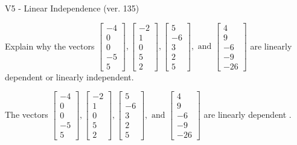\begin{exercise}
  \begin{exerciseTitle}V5 - Linear Independence (ver. 135)\end{exerciseTitle}
  \begin{exerciseStatement}
    Explain why the vectors \(\left[\begin{array}{r}
-4 \\
0 \\
0 \\
-5 \\
5
\end{array}\right] , \left[\begin{array}{r}
-2 \\
1 \\
0 \\
5 \\
2
\end{array}\right] , \left[\begin{array}{r}
5 \\
-6 \\
3 \\
2 \\
5
\end{array}\right] , \text{ and } \left[\begin{array}{r}
4 \\
9 \\
-6 \\
-9 \\
-26
\end{array}\right]\) are linearly dependent or linearly independent.	


  \end{exerciseStatement}
  \begin{exerciseAnswer}
   The vectors \(\left[\begin{array}{r}
-4 \\
0 \\
0 \\
-5 \\
5
\end{array}\right] , \left[\begin{array}{r}
-2 \\
1 \\
0 \\
5 \\
2
\end{array}\right] , \left[\begin{array}{r}
5 \\
-6 \\
3 \\
2 \\
5
\end{array}\right] , \text{ and } \left[\begin{array}{r}
4 \\
9 \\
-6 \\
-9 \\
-26
\end{array}\right]\) are 
  	 linearly dependent  .
  


  \end{exerciseAnswer}
\end{exercise}